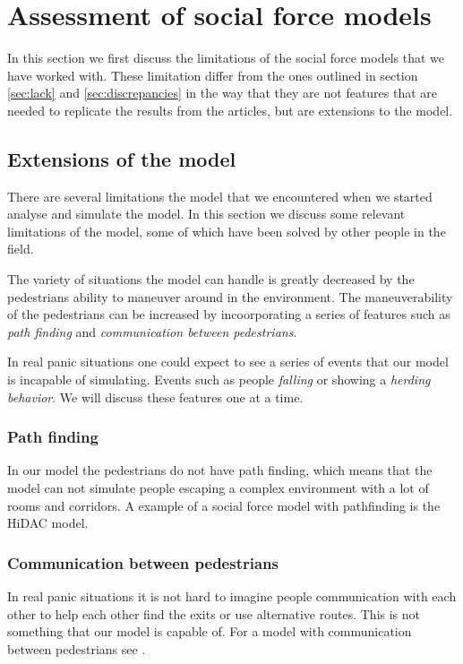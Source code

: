 \section{Assessment of social force models}
\label{sec:assessment}
In this section we first discuss the limitations of the social force models 
that we have worked with. These limitation differ from the ones outlined in 
section \ref{sec:lack} and \ref{sec:discrepancies} in the way that 
they are not features that are needed to replicate the results from the articles, 
but are extensions to the model.

\subsection{Extensions of the model}
There are several limitations the model that we encountered when we started 
analyse and simulate the model. In this section we discuss some relevant 
limitations of the model, some of which have been solved by other people in the 
field. 

The variety of situations the model can handle is greatly decreased by the 
pedestrians ability to maneuver around in the environment. The maneuverability of 
the pedestrians can be increased by incoorporating a series of features such as 
\emph{path finding} and \emph{communication between pedestrians}. 

In real panic situations one could expect to see a series of events that our 
model is incapable of simulating. Events such as people \emph{falling} or showing a 
\emph{herding behavior}. We will discuss these features one at a time.

\subsubsection{Path finding}
In our model the pedestrians do not have path finding, which means that the model 
can not simulate people escaping a complex environment with a lot of rooms 
and corridors. A example of a social force model with pathfinding is the HiDAC 
model\cite{HiDAC}.

\subsubsection{Communication between pedestrians}
In real panic situations it is not hard to imagine people communication with 
each other to help each other find the exits or use alternative routes. This is 
not something that our model is capable of. For a model with communication between 
pedestrians see \cite{HiDAC}.

